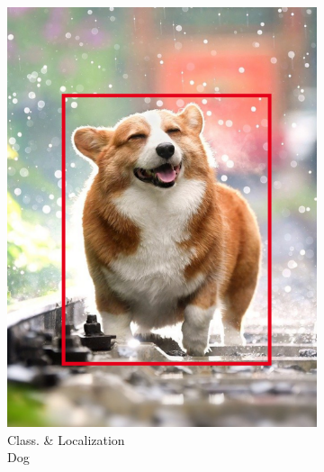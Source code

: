 \begin{figure}
\begin{subfigure}{0.24\linewidth}
			\includegraphics[width=\linewidth]{img/compressed-dog-localized.png}
			\caption{Class. \& Localization \\ Dog}
		\end{subfigure}
		\begin{subfigure}{0.24\linewidth}
			\captionsetup{justification=centering}
			\centering

\end{subfigure}
\end{figure}

